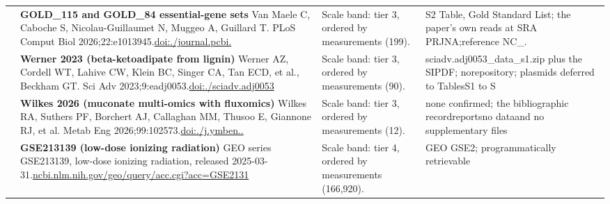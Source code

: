 \begin{landscape}
\begin{longtable}{@{}r@{\hspace{4pt}} L{78mm} L{72mm} L{76mm}@{}}
 & \textbf{GOLD\_115 and GOLD\_84 essential-gene sets} \newline Van Maele C, Caboche S, Nicolau-Guillaumet N, Muggeo A, Guillard T. PLoS Comput Biol 2026;22:e1013945.\newline \href{https://doi.org/10.1371/journal.pcbi.1013945}{doi:./\allowbreak journal\allowbreak .\allowbreak pcbi.} & Scale band: tier 3, ordered by measurements (199). & S2 Table\allowbreak , Gold S\allowbreak tandard \allowbreak List; th\allowbreak e paper'\allowbreak s own re\allowbreak ads at S\allowbreak RA PRJNA;\allowbreak  referen\allowbreak ce NC\_. \\
 & \textbf{Werner 2023 (beta-ketoadipate from lignin)} \newline Werner AZ, Cordell WT, Lahive CW, Klein BC, Singer CA, Tan ECD, et al., Beckham GT. Sci Adv 2023;9:eadj0053.\newline \href{https://doi.org/10.1126/sciadv.adj0053}{doi:./\allowbreak sciadv.\allowbreak adj0053} & Scale band: tier 3, ordered by measurements (90). & sciadv.\allowbreak adj0053\_\allowbreak data\_\allowbreak s1.\allowbreak zip plu\allowbreak s the SI\allowbreak  PDF; no\allowbreak  reposit\allowbreak ory; pla\allowbreak smids de\allowbreak ferred t\allowbreak o Tables\allowbreak  S1 to S \\
 & \textbf{Wilkes 2026 (muconate multi-omics with fluxomics)} \newline Wilkes RA, Suthers PF, Borchert AJ, Callaghan MM, Thusoo E, Giannone RJ, et al. Metab Eng 2026;99:102573.\newline \href{https://doi.org/10.1016/j.ymben.2026.102573}{doi:./\allowbreak j.\allowbreak ymben..} & Scale band: tier 3, ordered by measurements (12). & none con\allowbreak firmed; \allowbreak the bibl\allowbreak iographi\allowbreak c record\allowbreak  reports\allowbreak  no data\allowbreak  and no \allowbreak suppleme\allowbreak ntary fi\allowbreak les \\
 & \textbf{GSE213139 (low-dose ionizing radiation)} \newline GEO series GSE213139, low-dose ionizing radiation, released 2025-03-31.\newline \href{https://www.ncbi.nlm.nih.gov/geo/query/acc.cgi?acc=GSE213139}{ncbi.\allowbreak nlm.\allowbreak nih.\allowbreak gov/\allowbreak geo/\allowbreak query/\allowbreak acc.\allowbreak cgi?\allowbreak acc=\allowbreak GSE2131} & Scale band: tier 4, ordered by measurements (166,920). & GEO GSE2; p\allowbreak rogramma\allowbreak tically \allowbreak retrieva\allowbreak ble \\

\end{longtable}
\end{landscape}
